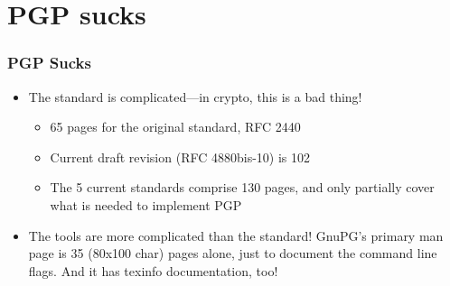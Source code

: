 \documentclass[aspectratio=1610,bigger,utf8]{beamer}
\begin{document}
\section{PGP sucks}

\begin{frame}
	\frametitle{PGP Sucks}
	\begin{itemize}
		\item The standard is complicated---in crypto, this is a bad thing!
			\begin{itemize}
				\item 65 pages for the original standard, RFC 2440
				\item Current draft revision 
					(\alert{RFC 4880bis-10}) is 102
				\item The 5 current standards comprise 130
					pages, and only partially cover what is
					needed to implement PGP
			\end{itemize}
		\item The \alert{tools} are more complicated than the standard!
			GnuPG's primary man page is 35 (80x100 char) pages
			alone, just to document the command line flags. And it
			has texinfo documentation, too!
	\end{itemize}
\end{frame}
\end{document}

